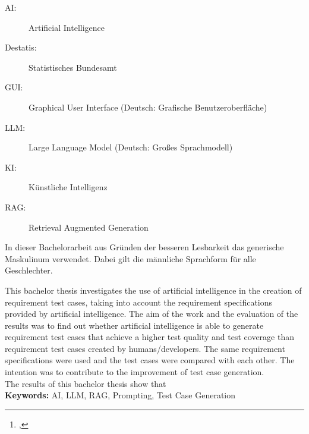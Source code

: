 \documentclass[12pt,toc=bib,toc=listof]{scrreprt}
\title{\reprttopic}
\author{\reprtstudentname\footnote{\reprtstudentid, \reprtstudentmail}}
\begin{document}
\maketitle
{}

\tableofcontents

\label{sec:abkuerzungsverzeichnis}

\begin{description}
  \item[AI:] Artificial Intelligence
  \item[Destatis:] Statistisches Bundesamt
  \item[GUI:] Graphical User Interface (Deutsch: Grafische Benutzeroberfläche)
  \item[LLM:] Large Language Model (Deutsch: Großes Sprachmodell)
  \item[KI:] Künstliche Intelligenz
  \item[RAG:] Retrieval Augmented Generation
\end{description}

\newpage
\listoffigures
\newpage
{} %
\label{sec:genderHinweis}
In dieser Bachelorarbeit aus Gründen der besseren Lesbarkeit das generische Maskulinum verwendet. Dabei gilt die männliche Sprachform für alle Geschlechter.

\label{sec:abstract}
This bachelor thesis investigates the use of artificial intelligence in the creation of requirement test cases, taking into account the requirement specifications provided by artificial intelligence. The aim of the work and the evaluation of the results was to find out whether artificial intelligence is able to generate requirement test cases that achieve a higher test quality and test coverage than requirement test cases created by humans/developers. The same requirement specifications were used and the test cases were compared with each other. The intention was to contribute to the improvement of test case generation.\\
The results of this bachelor thesis show that
\\
\textbf{Keywords:} AI, LLM, RAG, Prompting, Test Case Generation
\newpage
\end{document}
